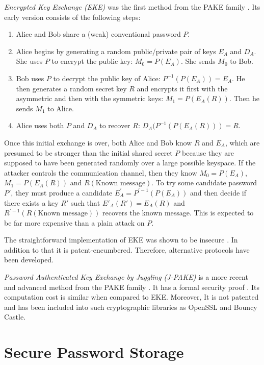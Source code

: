\emph{Encrypted Key Exchange (EKE)} was the first method from the PAKE family \cite{bellovin1992encrypted, bellovin1993augmented}. Its early version consists of the following steps:

\begin{enumerate}
    \item Alice and Bob share a (weak) conventional password \(P\).
    \item Alice begins by generating a random public/private pair of keys \(E_A\) and \(D_A\). She uses \(P\) to encrypt the public key: \(M_0 = P(E_A)\). She sends \(M_0\) to Bob.
    \item Bob uses \(P\) to decrypt the public key of Alice: \(P^{-1}(P(E_A)) = E_A\). He then generates a random secret key \(R\) and encrypts it first with the asymmetric and then with the symmetric keys: \(M_1 = P(E_A(R))\). Then he sends \(M_1\) to Alice.
    \item Alice uses both \(P\) and \(D_A\) to recover \(R\): \(D_A(P^{-1}(P(E_A(R))) = R\).
  \end{enumerate}

Once this initial exchange is over, both Alice and Bob know \(R\) and \(E_A\), which are presumed to be stronger than the initial shared secret \(P\) because they are supposed to have been generated randomly over a large possible keyspace. If the attacker controls the communication channel, then they know \(M_0 = P(E_A)\), \(M_1 = P(E_A(R))\) and \(R(\text{Known message})\). To try some candidate password \(P'\), they must produce a candidate \(E_A^{'} = P^{'-1}(P(E_A))\) and then decide if there exists a key \(R'\) such that \(E'_A(R') = E_A(R)\) and \(R^{'-1}(R(\text{Known message}))\) recovers the known message. This is expected to be far more expensive than a plain attack on \(P\).

The straightforward implementation of EKE was shown to be insecure \cite{hao2010j}. In addition to that it is patent-encumbered. Therefore, alternative protocols have been developed.

\emph{Password Authenticated Key Exchange by Juggling (J-PAKE)} is a more recent and advanced method from the PAKE family \cite{hao2010j}. It has a formal security proof \cite{abdalla2015security}. Its computation cost is similar when compared to EKE. Moreover, It is not patented and has been included into such cryptographic libraries as OpenSSL and Bouncy Castle.

\section{Secure Password Storage}
\label{sec:secure-password-storage}

